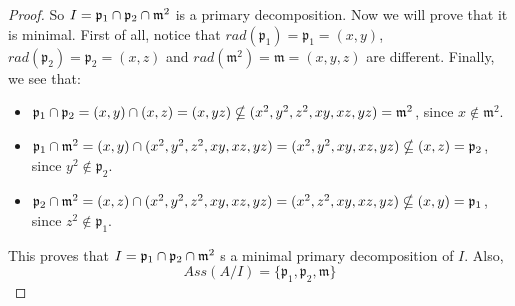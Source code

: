 \begin{problem}
\begin{sol}
\begin{proof}
            So $I = \mathfrak{p}_1 \cap \mathfrak{p}_2 \cap \mathfrak{m}^2$ is a primary decomposition.
            Now we will prove that it is minimal.
            First of all, notice that $rad(\mathfrak{p}_1) = \mathfrak{p}_1 = (x,y)$, $rad(\mathfrak{p}_2) = \mathfrak{p}_2 = (x,z)$ and $rad(\mathfrak{m}^2) = \mathfrak{m}= (x,y,z)$ are different.
            Finally, we see that:
            \begin{itemize}
                \item $\mathfrak{p}_1 \cap \mathfrak{p}_2 = (x,y) \cap (x,z) = (x, yz) \nsubseteq (x^2, y^2, z^2, xy, xz, yz) = \mathfrak{m}^2$, since $x \notin \mathfrak{m}^2$.
                \item $\mathfrak{p}_1 \cap \mathfrak{m}^2 = (x,y) \cap (x^2, y^2, z^2, xy, xz, yz) = (x^2, y^2, xy, xz, yz) \nsubseteq (x, z) = \mathfrak{p}_2$, since $y^2 \notin \mathfrak{p}_2$.
                \item $\mathfrak{p}_2 \cap \mathfrak{m}^2 = (x,z) \cap (x^2, y^2, z^2, xy, xz, yz) = (x^2, z^2, xy, xz, yz) \nsubseteq (x, y) = \mathfrak{p}_1$, since $z^2 \notin \mathfrak{p}_1$.
            \end{itemize}
            This proves that $I = \mathfrak{p}_1 \cap \mathfrak{p}_2 \cap \mathfrak{m}^2$ s a minimal primary decomposition of $I$.
            Also,
            \[ Ass(A/I) = \{\mathfrak{p}_1, \mathfrak{p}_2, \mathfrak{m}\} \]
        \end{proof}
    \end{sol}
\end{problem}